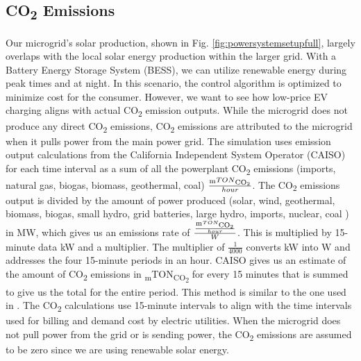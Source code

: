 \documentclass[conference,  usletter]{IEEEtran}
\begin{document}
 \subsection{CO\textsubscript{2} Emissions}
 Our microgrid's solar production, shown in Fig. \ref{fig:powersystemsetupfull}, largely overlaps with the local solar energy production within the larger grid. With a Battery Energy Storage System (BESS), we can utilize renewable energy during peak times and at night. In this scenario, the control algorithm is optimized to minimize cost for the consumer. However, we want to see how low-price EV charging aligns with actual CO\textsubscript{2} emission outputs. While the microgrid does not produce any direct CO\textsubscript{2} emissions, CO\textsubscript{2} emissions are attributed to the microgrid when it pulls power from the main power grid. The simulation uses emission output calculations from the California Independent System Operator (CAISO) for each time interval as a sum of all the powerplant CO\textsubscript{2} emissions (imports, natural gas, biogas, biomass, geothermal, coal) $\frac{\textsubscript{m}TON\textsubscript{CO\textsubscript{2}}}{hour}$. The CO\textsubscript{2} emissions output is divided by the amount of power produced (solar, wind, geothermal, biomass, biogas, small hydro, grid batteries, large hydro, imports, nuclear, coal ) in MW, which gives us an emissions rate of $\frac{\frac{\textsubscript{m}TON\textsubscript{CO\textsubscript{2}}}{hour}}{W}$. This is multiplied by 15-minute data kW and a multiplier. The multiplier of  $\frac{1}{4000}$ converts kW into W and addresses the four 15-minute periods in an hour. CAISO gives us an estimate of the amount of CO\textsubscript{2} emissions in \textsubscript{m}TON\textsubscript{CO\textsubscript{2}} for every 15 minutes that is summed to give us the total for the entire period. This method is similar to the one used in \cite{garrido2021dynamic}. The CO\textsubscript{2} calculations use 15-minute intervals to align with the time intervals used for billing and demand cost by electric utilities. When the microgrid does not pull power from the grid or is sending power, the CO\textsubscript{2} emissions are assumed to be zero since we are using renewable solar energy.
\end{document}
